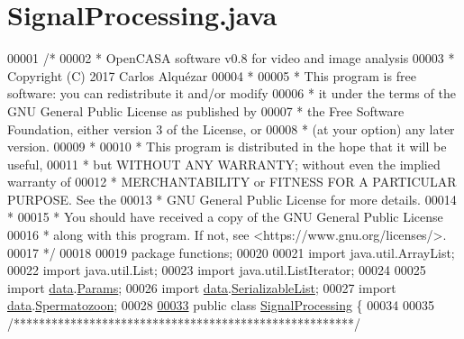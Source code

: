 \hypertarget{_signal_processing_8java_source}{}\section{Signal\+Processing.\+java}
\label{_signal_processing_8java_source}

\begin{DoxyCode}
00001 \textcolor{comment}{/*}
00002 \textcolor{comment}{ *   OpenCASA software v0.8 for video and image analysis}
00003 \textcolor{comment}{ *   Copyright (C) 2017  Carlos Alquézar}
00004 \textcolor{comment}{ *}
00005 \textcolor{comment}{ *   This program is free software: you can redistribute it and/or modify}
00006 \textcolor{comment}{ *   it under the terms of the GNU General Public License as published by}
00007 \textcolor{comment}{ *   the Free Software Foundation, either version 3 of the License, or}
00008 \textcolor{comment}{ *   (at your option) any later version.}
00009 \textcolor{comment}{ *}
00010 \textcolor{comment}{ *   This program is distributed in the hope that it will be useful,}
00011 \textcolor{comment}{ *   but WITHOUT ANY WARRANTY; without even the implied warranty of}
00012 \textcolor{comment}{ *   MERCHANTABILITY or FITNESS FOR A PARTICULAR PURPOSE.  See the}
00013 \textcolor{comment}{ *   GNU General Public License for more details.}
00014 \textcolor{comment}{ *}
00015 \textcolor{comment}{ *   You should have received a copy of the GNU General Public License}
00016 \textcolor{comment}{ *   along with this program.  If not, see <https://www.gnu.org/licenses/>.}
00017 \textcolor{comment}{*/}    
00018 
00019 \textcolor{keyword}{package }functions;
00020 
00021 \textcolor{keyword}{import} java.util.ArrayList;
00022 \textcolor{keyword}{import} java.util.List;
00023 \textcolor{keyword}{import} java.util.ListIterator;
00024 
00025 \textcolor{keyword}{import} \hyperlink{namespacedata}{data}.\hyperlink{classdata_1_1_params}{Params};
00026 \textcolor{keyword}{import} \hyperlink{namespacedata}{data}.\hyperlink{classdata_1_1_serializable_list}{SerializableList};
00027 \textcolor{keyword}{import} \hyperlink{namespacedata}{data}.\hyperlink{classdata_1_1_spermatozoon}{Spermatozoon};
00028 
\hypertarget{_signal_processing_8java_source_l00033}{}\hyperlink{classfunctions_1_1_signal_processing}{00033} \textcolor{keyword}{public} \textcolor{keyword}{class }\hyperlink{classfunctions_1_1_signal_processing}{SignalProcessing} \{
00034 
00035   \textcolor{comment}{/******************************************************/}

\end{DoxyCode}
